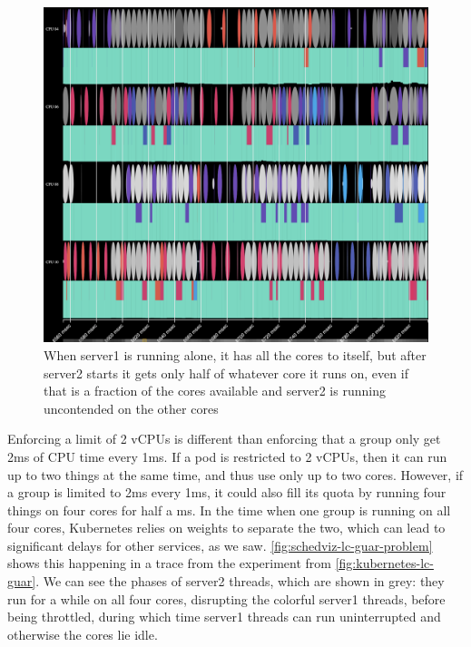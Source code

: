 \begin{figure}[t]
    \centering
    \includegraphics[width=\columnwidth]{graphs/schedviz-lc-guar-problem.png}
    \caption{When server1 is running alone, it has all the cores to itself, but
    after server2 starts it gets only half of whatever core it runs on, even if
    that is a fraction of the cores available and server2 is running uncontended
    on the other cores}\label{fig:schedviz-lc-guar-problem}
\end{figure}

Enforcing a limit of 2 vCPUs is different than enforcing that a group only get
2ms of CPU time every 1ms. If a pod is restricted to 2 vCPUs, then it can run up
to two things at the same time, and thus use only up to two cores. However, if a
group is limited to 2ms every 1ms, it could also fill its quota by running four
things on four cores for half a ms. In the time when one group is running on all
four cores, Kubernetes relies on weights to separate the two, which can lead to
significant delays for other services, as we saw.
\autoref{fig:schedviz-lc-guar-problem} shows this happening in a trace from the
experiment from \autoref{fig:kubernetes-lc-guar}. We can see the phases of
server2 threads, which are shown in grey: they run for a while on all four
cores, disrupting the colorful server1 threads, before being throttled, during
which time server1 threads can run uninterrupted and otherwise the cores lie
idle.


